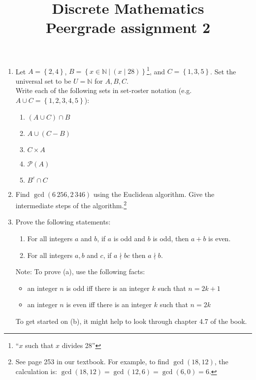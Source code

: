 \documentclass[11pt,a4paper]{article}
\title{Discrete Mathematics\\
Peergrade assignment 2}
\date{}
\newcommand\set[1]{\left\{#1\right\}}
\newcommand\setcom[2]{\left\{#1~|~#2\right\}}
\newcommand\compl[1]{{#1}^{c}}
\newcommand\powerset[1]{{\mathcal{P}}\left(#1\right)}
\newcommand{\N}{\mathbb{N}}
\begin{document}
\maketitle

\begin{enumerate}
\item Let $A = \set{2, 4}$,  $B = \setcom{x \in \N}{(x \mid 28)}$\footnote{``$x$ such that $x$ divides 28''}, and $C = \set{1, 3, 5}$.
Set the universal set to be $U = \N$ for $A, B, C$.\\
Write each of the following sets in set-roster notation
  (e.g. $A \cup C = \set{1, 2, 3, 4, 5}$):
  \begin{enumerate}
  \item $(A \cup C) \cap B$
  \item $A \cup (C - B)$
  \item $C \times A$
  \item $\powerset{A}$
  \item $\compl{B} \cap C$
  \end{enumerate}
\item Find $\gcd(6\, 256, 2\, 346)$ using the Euclidean algorithm. Give
  the intermediate steps of the algorithm.\footnote{See page 253 in
    our textbook. For example, to find $\gcd(18,12)$, the calculation
    is: $\gcd(18,12) = \gcd(12,6) = \gcd(6,0) = 6$.}

\item Prove the following statements:

  \begin{enumerate}
  \item For all integers $a$ and  $b$, if $a$ is odd and $b$ is odd, then $a+b$ is even.
  \item For all integers $a, b$ and $c$, if $a \nmid b c$ then $a \nmid b$.
  \end{enumerate}

  Note: To prove (a), use the following facts:
  \begin{itemize}
    \item an integer $n$ is odd iff there is an integer $k$ such that $n = 2k + 1$
    \item an integer $n$ is even iff there is an integer $k$ such that $n = 2k$
  \end{itemize}
  To get started on (b), it might help to look through chapter 4.7 of the book.
\end{enumerate}
\end{document}
